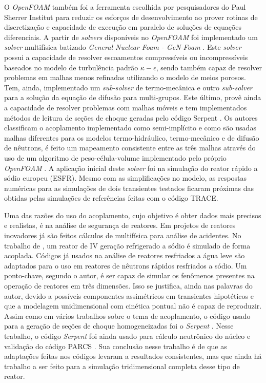 O \textit{OpenFOAM} também foi a ferramenta escolhida por pesquisadores do Paul Sherrer
Institut para reduzir os esforços de desenvolvimento ao prover rotinas de discretização
e capacidade de execução em paralelo de soluções de equações diferenciais. A partir
de \textit{solvers} disponíveis no \textit{OpenFOAM} foi implementado um \textit{solver}
multifísica batizado \textit{General Nuclear Foam - GeN-Foam} \cite{Fiorina2015}.
Este \textit{solver}
possui a capacidade de resolver escoamentos compressíveis ou incompressíveis baseados
no modelo de turbulência padrão $\kappa-\epsilon$, sendo também capaz de resolver
problemas em malhas menos refinadas utilizando o modelo de meios porosos. Tem, ainda,
implementado um \textit{sub-solver} de termo-mecânica e outro \textit{sub-solver} para
a solução da equação de difusão para multi-grupos. Este último, provê ainda a capacidade
de resolver problemas com malhas móveis e tem implementados métodos de leitura de seções
de choque geradas pelo código Serpent \cite{Serpent2013}. Os autores classificam
o acoplamento implementado como semi-implícito e como são usadas malhas diferentes para
os modelos termo-hidráulico, termo-mecânico e de difusão de nêutrons, é feito um mapeamento
consistente entre as três malhas através do uso de um algoritmo de peso-célula-volume
implementado pelo próprio \textit{OpenFOAM} \cite{OpenFOAM2015}. A aplicação inicial deste
\textit{solver} foi na simulação do reator rápido a sódio europeu (ESFR). Mesmo com as
simplificações no modelo, as respostas numéricas para as simulações de dois transientes
testados ficaram próximas das obtidas pelas simulações de referências feitas com o
código TRACE.

Uma das razões do uso do acoplamento, cujo objetivo é obter dados mais precisos e realistas, é na 
análise de segurança de reatores. Em projetos de reatores inovadores já são feitos cálculos de multifísica para 
análise de acidentes. No trabalho de \cite{Lazaro2013}, um reator de IV geração refrigerado a sódio 
é simulado de forma acoplada. Códigos já usados na análise de reatores resfriados a água leve são adaptados 
para o uso em reatores de nêutrons rápidos resfriados a sódio. Um ponto-chave, segundo o autor, é ser capaz 
de simular os fenômenos presentes na operação de reatores em três dimensões. Isso se justifica, ainda nas 
palavras do autor, devido a possíveis componentes assimétricos em transientes hipotéticos e que 
a modelagem unidimensional com cinética pontual não é capaz de reproduzir. Assim como em vários trabalhos 
sobre o tema de acoplamento, o código usado para a geração de seções de choque homogeneizadas 
foi o \textit{Serpent} \cite{Serpent2013}. Nesse trabalho, o código \textit{Serpent} foi ainda usado 
para cálculo neutrônico do núcleo e validação do código PARCS \cite{PARCS2006}. Sua conclusão nesse trabalho 
é de que as adaptações feitas nos códigos levaram a resultados consistentes, mas que ainda há trabalho 
a ser feito para a simulação tridimensional completa desse tipo de reator.

